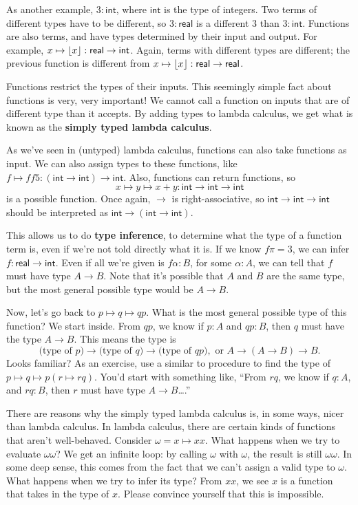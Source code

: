 \documentclass[11pt,paper=letter]{scrartcl}
\newcommand{\sf}{\mathsf}
\begin{document}
As another example, $3 : \sf{int}$, where $\sf{int}$ is the type of integers. Two terms of different types have to be different, so $3 : \sf{real}$ is a different $3$ than $3 : \sf{int}$. Functions are also terms, and have types determined by their input and output. For example, $x \mapsto \floor{x} : \sf{real} \to \sf{int}$. Again, terms with different types are different; the previous function is different from $x \mapsto \floor{x} : \sf{real} \to \sf{real}$.

Functions restrict the types of their inputs. This seemingly simple fact about functions is very, very important! We cannot call a function on inputs that are of different type than it accepts. By adding types to lambda calculus, we get what is known as the \textbf{simply typed lambda calculus}.

As we've seen in (untyped) lambda calculus, functions can also take functions as input. We can also assign types to these functions, like $f \mapsto ff5 : (\sf{int} \to \sf{int}) \to \sf{int}$. Also, functions can return functions, so \[
x \mapsto y \mapsto x + y : \sf{int} \to \sf{int} \to \sf{int}
\] is a possible function. Once again, $\to$ is right-associative, so $\sf{int} \to \sf{int} \to \sf{int}$ should be interpreted as $\sf{int} \to (\sf{int} \to \sf{int})$.

This allows us to do \textbf{type inference}, to determine what the type of a function term is, even if we're not told directly what it is. If we know $f\pi = 3$, we can infer $f : \sf{real} \to \sf{int}$. Even if all we're given is $f\alpha : B$, for some $\alpha : A$, we can tell that $f$ must have type $A \to B$. Note that it's possible that $A$ and $B$ are the same type, but the most general possible type would be $A \to B$.

Now, let's go back to $p \mapsto q \mapsto qp$. What is the most general possible type of this function? We start inside. From $qp$, we know if $p : A$ and $qp : B$, then $q$ must have the type $A \to B$. This means the type is \[
  \text{(type of $p$)} \to \text{(type of $q$)} \to \text{(type of $qp$)}, \text{ or } A \to (A \to B) \to B.
\]
Looks familiar? As an exercise, use a similar to procedure to find the type of $p \mapsto q \mapsto p(r \mapsto rq)$. You'd start with something like, ``From $rq$, we know if $q : A$, and $rq : B$, then $r$ must have type $A \to B$\dots.''

There are reasons why the simply typed lambda calculus is, in some ways, nicer than lambda calculus. In lambda calculus, there are certain kinds of functions that aren't well-behaved. Consider $\omega = x \mapsto xx$. What happens when we try to evaluate $\omega\omega$? We get an infinite loop: by calling $\omega$ with $\omega$, the result is still $\omega\omega$. In some deep sense, this comes from the fact that we can't assign a valid type to $\omega$. What happens when we try to infer its type? From $xx$, we see $x$ is a function that takes in the type of $x$. Please convince yourself that this is impossible.
\end{document}
